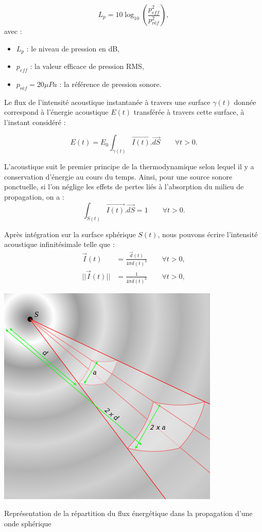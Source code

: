 \begin{equation} 
L_p = 10 \log_{10}\left(\frac{p_{eff}^2}{p_{réf}^2}\right),
\end{equation}
avec :
\begin{itemize}
\item $L_p$ : le niveau de pression en dB,
\item $p_{eff}$ : la valeur efficace de pression \gls{RMS},
\item $p_{réf} = 20 \mu Pa$ : la référence de pression sonore.
\end{itemize}

Le flux de l'intensité acoustique instantanée à travers une surface  $\gamma(t)$ donnée correspond à l'énergie acoustique $E(t)$ transférée à travers cette surface, à l'instant considéré :

\begin{equation} 
E(t) = E_0 \int_{\gamma(t)} \overrightarrow{I(t)}.\overrightarrow{dS} \qquad \forall t > 0.
\end{equation}

L'acoustique suit le premier principe de la thermodynamique selon lequel il y a conservation d'énergie au cours du temps. Ainsi, pour une source sonore ponctuelle, si l'on néglige les effets de pertes liés à l'absorption du milieu de propagation, on a : 
\begin{equation} 
\int_{S(t)} \overrightarrow{I(t)}.\overrightarrow{dS} = 1 \qquad \forall t > 0.
\end{equation}

Après intégration sur la surface sphérique $S(t)$, nous pouvons écrire l'intensité acoustique infinitésimale telle que :
\begin{align} 
 \overrightarrow{I}(t) &= \frac{ \overrightarrow{d}(t)}{4\pi d(t)^3} \qquad \forall t > 0 \nonumber, \\
|| \overrightarrow{I}(t) || &= \frac{1}{4\pi d(t)^2} \qquad \forall t > 0,
\end{align}

\begin{figureth}
	\includegraphics[width=0.5\linewidth]{images/flux}
	\caption{Représentation de la répartition du flux énergétique dans la propagation d'une onde sphérique}
	\label{flux}
\end{figureth}

